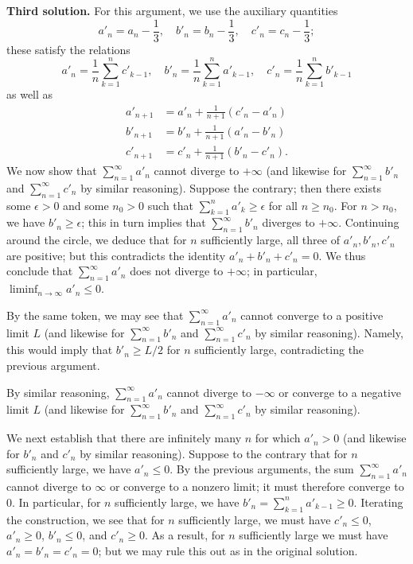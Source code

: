 \documentclass[amssymb,twocolumn,pra,10pt,aps]{revtex4-1}
\begin{document}
\begin{itemize}
\noindent
\textbf{Third solution.}
For this argument, we use the auxiliary quantities
\[
a'_n = a_n - \frac{1}{3}, \quad b'_n = b_n - \frac{1}{3}, \quad c'_n = c_n - \frac{1}{3};
\]
these satisfy the relations
\[
a'_n = \frac{1}{n} \sum_{k=1}^{n} c'_{k-1}, \quad
b'_n = \frac{1}{n} \sum_{k=1}^{n} a'_{k-1}, \quad
c'_n = \frac{1}{n} \sum_{k=1}^{n} b'_{k-1}
\]
as well as 
\begin{align*}
a'_{n+1} &= a'_n + \frac{1}{n+1} (c'_n-a'_n)  \\
b'_{n+1} &= b'_n + \frac{1}{n+1} (a'_n-b'_n) \\
c'_{n+1} &= c'_n + \frac{1}{n+1} (b'_n-c'_n).
\end{align*}
We now show that $\sum_{n=1}^\infty a'_n$ cannot diverge to $+\infty$
(and likewise for $\sum_{n=1}^\infty b'_n$ and $\sum_{n=1}^\infty c'_n$ by similar reasoning).
Suppose the contrary; then there exists some $\epsilon > 0$ and some $n_0 > 0$ 
such that $\sum_{k=1}^n a'_k \geq \epsilon$ for all $n \geq n_0$.
For $n > n_0$, we have $b'_n \geq \epsilon$; this in turn implies that $\sum_{n=1}^\infty b'_n$ diverges to $+\infty$.
Continuing around the circle, we deduce that for $n$ sufficiently large, all three of $a'_n, b'_n, c'_n$ are positive;
but this contradicts the identity $a'_n + b'_n + c'_n = 0$. We thus conclude that $\sum_{n=1}^\infty a'_n$ does not diverge to $+\infty$; in particular, $\liminf_{n \to \infty} a'_n \leq 0$.

By the same token, we may see that $\sum_{n=1}^\infty a'_n$ cannot converge to a positive limit $L$
(and likewise for $\sum_{n=1}^\infty b'_n$ and $\sum_{n=1}^\infty c'_n$ by similar reasoning).
Namely, this would imply that $b'_n \geq L/2$ for $n$ sufficiently large, contradicting the previous argument.

By similar reasoning, $\sum_{n=1}^\infty a'_n$ cannot diverge to $-\infty$ or converge to a negative limit $L$
(and likewise for $\sum_{n=1}^\infty b'_n$ and $\sum_{n=1}^\infty c'_n$ by similar reasoning).

We next establish that there are infinitely many $n$ for which $a'_n > 0$ (and likewise for $b'_n$ and $c'_n$ by similar reasoning).
Suppose to the contrary that for $n$ sufficiently large, we have $a'_n \leq 0$. 
By the previous arguments, the sum $\sum_{n=1}^\infty a'_n$ cannot diverge to $\infty$ or converge to a nonzero limit;
it must therefore converge to 0. In particular, for $n$ sufficiently large, we have
$b'_n = \sum_{k=1}^n a'_{k-1} \geq 0$. Iterating the construction, we see that for $n$ sufficiently large,
we must have $c'_n \leq 0$, $a'_n \geq 0$, $b'_n \leq 0$, and $c'_n \geq 0$. As a result, for $n$
sufficiently large we must have $a'_n = b'_n = c'_n = 0$; but we may rule this out as in the original solution.


\end{itemize}
\end{document}
